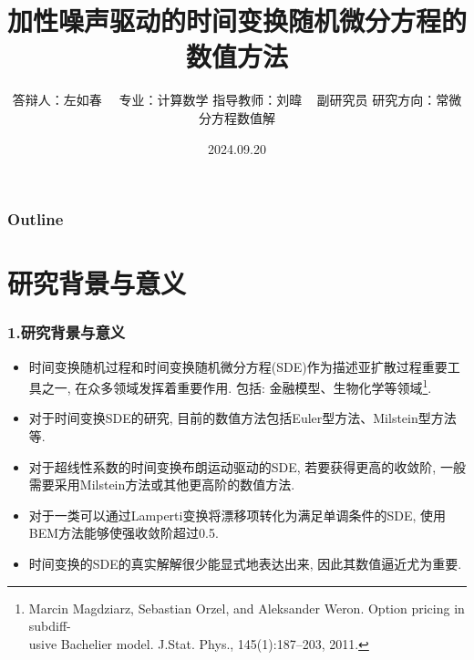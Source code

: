 \documentclass[notheorems,10pt,compress]{beamer}
\title[加性噪声驱动的时间变换随机微分方程的数值方法]{加性噪声驱动的时间变换随机微分方程的数值方法}
\author[左如春]
{
	答辩人：左如春~~ \vskip 3mm
	专业：计算数学 \vskip 3mm
	指导教师：刘暐 ~ 副研究员 \vskip 3mm
	研究方向：常微分方程数值解
}
\institute[上海师范大学]{}
\date[2024.09.20]{2024.09.20}
\numberwithin{figure}{section}
\numberwithin{table}{section}
\numberwithin{equation}{section}
\numberwithin{theorem}{section}
\numberwithin{definition}{section}
\numberwithin{lemma}{section}
\numberwithin{proposition}{section}
\numberwithin{corollary}{section}
\theoremstyle{example}
\begin{document}
	
	
	\begin{frame}
		\titlepage
	\end{frame}
	
	\begin{frame}
		\frametitle{Outline}
		\vskip -5.6pt
		\hspace*{1.5em}
		\parbox[t]{.95\textwidth}{
			\begin{minipage}[c][0.6\textheight]{\textwidth}
				\tableofcontents
			\end{minipage}
		}
	\end{frame}
	
	\section{研究背景与意义}
	
	\begin{frame}
		\frametitle{1.研究背景与意义}
		
		\begin{itemize}
			\setlength{\itemsep}{10pt}
			\item 时间变换随机过程和时间变换随机微分方程(SDE)作为描述亚扩散过程重要工具之一, 在众多领域发挥着重要作用. 包括: 金融模型、生物化学等领域\footnote{Marcin Magdziarz, Sebastian Orzel, and Aleksander Weron. Option pricing in subdiff-\\
				usive Bachelier model. J.Stat. Phys., 145(1):187–203, 2011.}.
			
			\item 对于时间变换SDE的研究, 目前的数值方法包括Euler型方法、Milstein型方法等. 
		\end{itemize}
		\begin{itemize}
			\setlength{\itemsep}{10pt}
			\item 对于超线性系数的时间变换布朗运动驱动的SDE, 若要获得更高的收敛阶, 
			一般需要采用Milstein方法或其他更高阶的数值方法.
			\item 对于一类可以通过Lamperti变换将漂移项转化为满足单调条件的SDE, 使用BEM方法能够使强收敛阶超过0.5. 
			\item 时间变换的SDE的真实解解很少能显式地表达出来, 因此其数值逼近尤为重要.
		\end{itemize}
	\end{frame}
	
%		
%			
%			
	
\end{document}
